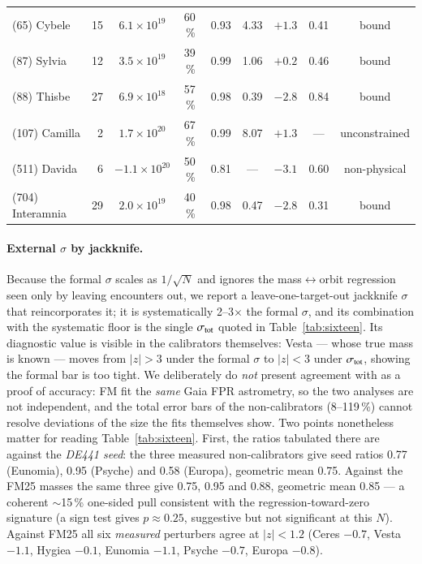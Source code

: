 \documentclass{aa}
\begin{document}
\begin{table}
\begin{tabular}{lrccccccc}
(65) Cybele      & 15 & $6.1\times10^{19}$  & 60\,\%  & 0.93 & 4.33 & $+1.3$ & 0.41 & bound \\
(87) Sylvia      & 12 & $3.5\times10^{19}$  & 39\,\%  & 0.99 & 1.06 & $+0.2$ & 0.46 & bound \\
(88) Thisbe      & 27 & $6.9\times10^{18}$  & 57\,\%  & 0.98 & 0.39 & $-2.8$ & 0.84 & bound \\
(107) Camilla    &  2 & $1.7\times10^{20}$  & 67\,\%  & 0.99 & 8.07 & $+1.3$ & ---  & unconstrained \\
(511) Davida     &  6 & $-1.1\times10^{20}$ & 50\,\%  & 0.81 & ---  & $-3.1$ & 0.60 & non-physical \\
(704) Interamnia & 29 & $2.0\times10^{19}$  & 40\,\%  & 0.98 & 0.47 & $-2.8$ & 0.31 & bound \\
\hline
\end{tabular}
\end{table}

\paragraph{External $\sigma$ by jackknife.} Because the formal $\sigma$ scales as
$1/\sqrt{N}$ and ignores the mass$\leftrightarrow$orbit regression seen only by
leaving encounters out, we report a leave-one-target-out jackknife $\sigma$ that
reincorporates it; it is systematically 2--3$\times$ the formal $\sigma$, and its
combination with the systematic floor is the single $\sigma_{\rm tot}$ quoted in
Table~\ref{tab:sixteen}. Its diagnostic value is visible in the calibrators
themselves: Vesta --- whose true mass is known --- moves from $|z|>3$ under the
formal $\sigma$ to $|z|<3$ under $\sigma_{\rm tot}$, showing the formal bar is too
tight. We deliberately do \emph{not} present agreement with
\citet{fuentesmunoz2025} as a proof of accuracy: FM fit the \emph{same} Gaia FPR
astrometry, so the two analyses are not independent, and the total error bars of
the non-calibrators (8--119\,\%) cannot resolve deviations of the size the fits
themselves show. Two points nonetheless matter for reading
Table~\ref{tab:sixteen}. First, the ratios tabulated there are against the
\emph{DE441 seed}: the three measured non-calibrators give seed ratios 0.77
(Eunomia), 0.95 (Psyche) and 0.58 (Europa), geometric mean 0.75. Against the
FM25 masses the same three give 0.75, 0.95 and 0.88, geometric mean 0.85 --- a
coherent $\sim$15\,\% one-sided pull consistent with the regression-toward-zero
signature (a sign test gives $p\approx0.25$, suggestive but not significant at
this $N$). Against FM25 all six \emph{measured} perturbers agree at $|z|<1.2$
(Ceres $-0.7$, Vesta $-1.1$, Hygiea $-0.1$, Eunomia $-1.1$, Psyche $-0.7$,
Europa $-0.8$).
\end{document}
